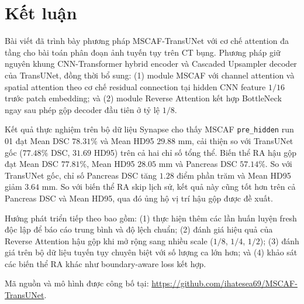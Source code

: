\documentclass[10pt,a4paper]{article}
\begin{document}
\section{Kết luận}

Bài viết đã trình bày phương pháp MSCAF-TransUNet với cơ chế attention đa tầng cho bài toán phân đoạn ảnh tuyến tụy trên CT bụng. Phương pháp giữ nguyên khung CNN-Transformer hybrid encoder và Cascaded Upsampler decoder của TransUNet, đồng thời bổ sung: (1) module MSCAF với channel attention và spatial attention \cite{woo2018cbam} theo cơ chế residual connection \cite{he2016resnet} tại hidden CNN feature $1/16$ trước patch embedding; và (2) module Reverse Attention kết hợp BottleNeck \cite{li2024rtaformer} ngay sau phép gộp decoder đầu tiên ở tỷ lệ $1/8$.

Kết quả thực nghiệm trên bộ dữ liệu Synapse cho thấy MSCAF \texttt{pre\_hidden} run 01 đạt Mean DSC $78.31\%$ và Mean HD95 $29.88$ mm, cải thiện so với TransUNet gốc ($77.48\%$ DSC, $31.69$ HD95) trên cả hai chỉ số tổng thể. Biến thể RA hậu gộp đạt Mean DSC $77.81\%$, Mean HD95 $28.05$ mm và Pancreas DSC $57.14\%$. So với TransUNet gốc, chỉ số Pancreas DSC tăng $1.28$ điểm phần trăm và Mean HD95 giảm $3.64$ mm. So với biến thể RA skip lịch sử, kết quả này cũng tốt hơn trên cả Pancreas DSC và Mean HD95, qua đó ủng hộ vị trí hậu gộp được đề xuất.

Hướng phát triển tiếp theo bao gồm: (1) thực hiện thêm các lần huấn luyện fresh độc lập để báo cáo trung bình và độ lệch chuẩn; (2) đánh giá hiệu quả của Reverse Attention hậu gộp khi mở rộng sang nhiều scale ($1/8$, $1/4$, $1/2$); (3) đánh giá trên bộ dữ liệu tuyến tụy chuyên biệt với số lượng ca lớn hơn; và (4) khảo sát các biến thể RA khác như boundary-aware loss kết hợp.

Mã nguồn và mô hình được công bố tại: \url{https://github.com/ihatesea69/MSCAF-TransUNet}.



\end{document}
